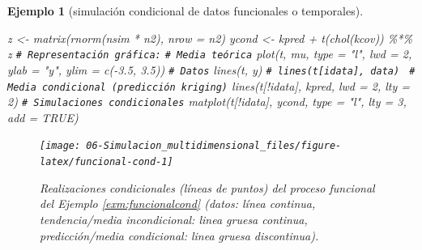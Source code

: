 \documentclass[
  10pt,
]{book}
\newenvironment{Shaded}{\begin{snugshade}}{\end{snugshade}}
\newcommand{\AttributeTok}[1]{\textcolor[rgb]{0.77,0.63,0.00}{#1}}
\newcommand{\CommentTok}[1]{\textcolor[rgb]{0.56,0.35,0.01}{\textit{#1}}}
\newcommand{\ConstantTok}[1]{\textcolor[rgb]{0.00,0.00,0.00}{#1}}
\newcommand{\DecValTok}[1]{\textcolor[rgb]{0.00,0.00,0.81}{#1}}
\newcommand{\FloatTok}[1]{\textcolor[rgb]{0.00,0.00,0.81}{#1}}
\newcommand{\FunctionTok}[1]{\textcolor[rgb]{0.00,0.00,0.00}{#1}}
\newcommand{\NormalTok}[1]{#1}
\newcommand{\OtherTok}[1]{\textcolor[rgb]{0.56,0.35,0.01}{#1}}
\newcommand{\SpecialCharTok}[1]{\textcolor[rgb]{0.00,0.00,0.00}{#1}}
\newcommand{\StringTok}[1]{\textcolor[rgb]{0.31,0.60,0.02}{#1}}
\theoremstyle{break}
\newtheorem{example}{Ejemplo}[chapter]
\theoremstyle{nonumberplain}
\renewcommand{\CommentTok}[1]{\textcolor[rgb]{0.41,0.41,0.41}{\texttt{#1}}}
\begin{document}
\begin{example}[simulación condicional de datos funcionales o temporales]
\begin{Shaded}
\begin{Highlighting}[]
\NormalTok{z }\OtherTok{\textless{}{-}} \FunctionTok{matrix}\NormalTok{(}\FunctionTok{rnorm}\NormalTok{(nsim }\SpecialCharTok{*}\NormalTok{ n2), }\AttributeTok{nrow =}\NormalTok{ n2)}
\NormalTok{ycond }\OtherTok{\textless{}{-}}\NormalTok{ kpred }\SpecialCharTok{+} \FunctionTok{t}\NormalTok{(}\FunctionTok{chol}\NormalTok{(kcov)) }\SpecialCharTok{\%*\%}\NormalTok{ z}
\CommentTok{\# Representación gráfica:}
\CommentTok{\#   Media teórica}
\FunctionTok{plot}\NormalTok{(t, mu, }\AttributeTok{type =} \StringTok{"l"}\NormalTok{, }\AttributeTok{lwd =} \DecValTok{2}\NormalTok{, }\AttributeTok{ylab =} \StringTok{"y"}\NormalTok{, }\AttributeTok{ylim =} \FunctionTok{c}\NormalTok{(}\SpecialCharTok{{-}}\FloatTok{3.5}\NormalTok{, }\FloatTok{3.5}\NormalTok{)) }
\CommentTok{\#   Datos}
\FunctionTok{lines}\NormalTok{(t, y) }\CommentTok{\# lines(t[idata], data) }
\CommentTok{\#   Media condicional (predicción kriging)}
\FunctionTok{lines}\NormalTok{(t[}\SpecialCharTok{!}\NormalTok{idata], kpred, }\AttributeTok{lwd =} \DecValTok{2}\NormalTok{, }\AttributeTok{lty =} \DecValTok{2}\NormalTok{)}
\CommentTok{\#   Simulaciones condicionales}
\FunctionTok{matplot}\NormalTok{(t[}\SpecialCharTok{!}\NormalTok{idata], ycond, }\AttributeTok{type =} \StringTok{"l"}\NormalTok{, }\AttributeTok{lty =} \DecValTok{3}\NormalTok{, }\AttributeTok{add =} \ConstantTok{TRUE}\NormalTok{) }
\end{Highlighting}
\end{Shaded}

\begin{figure}[!htbp]

{\centering \texttt{[image: 06-Simulacion\_multidimensional\_files/figure-latex/funcional-cond-1]} 

}

\caption{Realizaciones condicionales (líneas de puntos) del proceso funcional del Ejemplo \ref{exm:funcionalcond} (datos: línea continua, tendencia/media incondicional: linea gruesa continua, predicción/media condicional: linea gruesa discontinua).}\label{fig:funcional-cond}
\end{figure}

\end{example}
\end{document}
